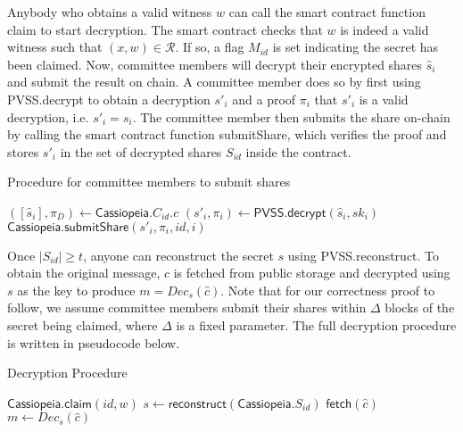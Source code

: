 Anybody who obtains a valid witness $w$ can call the smart contract function \textsf{claim} to start decryption.
The smart contract checks that $w$ is indeed a valid witness such that $(x, w) \in \mathcal{R}$.
If so, a flag $M_{id}$ is set indicating the secret has been claimed.
Now, committee members will decrypt their encrypted shares $\hat{s}_i$ and submit the result on chain.
A committee member does so by first using \textsf{PVSS.decrypt} to obtain a decryption $s'_i$ and a proof $\pi_i$ that $s'_i$ is a valid decryption, i.e. $s'_i = s_i$.
The committee member then submits the share on-chain by calling the smart contract function \textsf{submitShare}, which verifies the proof and stores $s'_i$ in the set of decrypted shares $S_{id}$ inside the contract.

\begin{algorithm}[H]
    \caption{Procedure for committee members to submit shares}
\label{alg:committee_member_no_incentives}
    \begin{algorithmic}[1]
            \State $([\hat{s}_i], \pi_D) \gets \textsf{Cassiopeia}.C_{id}.c$
            \State $(s'_i, \pi_i) \gets \textsf{PVSS.decrypt}(\hat{s}_i, sk_i)$
            \State $\textsf{Cassiopeia.submitShare}(s'_i, \pi_i, id, i)$
        \EndOn
    \end{algorithmic}
\end{algorithm}

Once $|S_{id}| \geq t$, anyone can reconstruct the secret $s$ using \textsf{PVSS.reconstruct}.
To obtain the original message, $\hat{c}$ is fetched from public storage and decrypted using $s$ as the key to produce $m = Dec_s(\hat{c})$.
Note that for our correctness proof to follow, we assume committee members submit their shares within $\Delta$ blocks of the secret being claimed, where $\Delta$ is a fixed parameter.
The full decryption procedure is written in pseudocode below.

\begin{algorithm}[H]
    \caption{Decryption Procedure}
    \label{alg:decryption_no_incentives}
    \begin{algorithmic}[1]
            \State $\textsf{Cassiopeia.claim}(id, w)$
                \State $s \gets \textsf{reconstruct}(\textsf{Cassiopeia}.S_{id})$
                \State $\textsf{fetch}(\hat{c})$
                \State $m \gets Dec_s(\hat{c})$
            \EndOn
        \EndFunction
    \end{algorithmic}
\end{algorithm}

